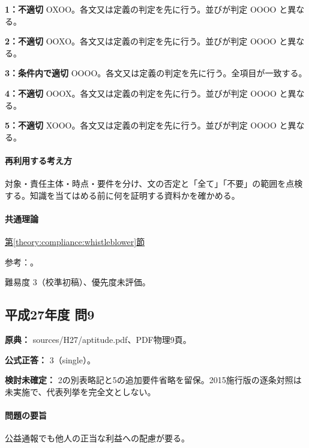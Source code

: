 \noindent\textbf{1：不適切} OXOO。各文又は定義の判定を先に行う。並びが判定 OOOO と異なる。\par

\noindent\textbf{2：不適切} OOXO。各文又は定義の判定を先に行う。並びが判定 OOOO と異なる。\par

\noindent\textbf{3：条件内で適切} OOOO。各文又は定義の判定を先に行う。全項目が一致する。\par

\noindent\textbf{4：不適切} OOOX。各文又は定義の判定を先に行う。並びが判定 OOOO と異なる。\par

\noindent\textbf{5：不適切} XOOO。各文又は定義の判定を先に行う。並びが判定 OOOO と異なる。\par

\paragraph{再利用する考え方} 対象・責任主体・時点・要件を分け、文の否定と「全て」「不要」の範囲を点検する。知識を当てはめる前に何を証明する資料かを確かめる。

\paragraph{共通理論} \hyperref[theory:compliance:whistleblower]{第\ref*{theory:compliance:whistleblower}節}

\par 参考：\cite{caa_handbook_pre2022,saf53_whistle_oldfaq}。

\par 難易度 3（校準初稿）、優先度未評価。

\subsection{平成27年度 問9}
\label{q:h27-reg-apt-09}

\noindent\textbf{原典：} sources/H27/aptitude.pdf、PDF物理9頁。

\textbf{公式正答：} 3（single）。

\par\textbf{検討未確定：} 2の別表略記と5の追加要件省略を留保。2015施行版の逐条対照は未実施で、代表列挙を完全文としない。

\paragraph{問題の要旨} 公益通報でも他人の正当な利益への配慮が要る。

